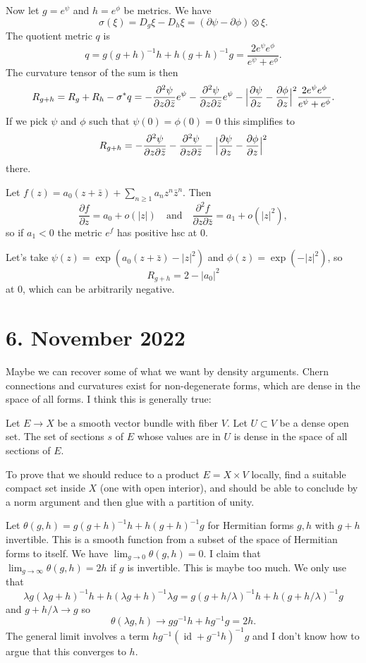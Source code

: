 \documentclass[11pt]{article}
\theoremstyle{definition}
\def\qandq{\quad\text{and}\quad}
\DeclareMathOperator{\id}{id}
\begin{document}
Now let $g = e^\psi$ and $h = e^\phi$ be metrics.
We have
$$
\sigma(\xi)
= D_{g} \xi - D_h \xi
= (\partial \psi - \partial \phi) \otimes \xi.
$$
The quotient metric $q$ is
$$
q
= g (g+h)^{-1} h + h (g+h)^{-1} g
= \frac{2 e^\psi e^\phi}{e^\psi + e^\phi}.
$$
The curvature tensor of the sum is then
$$
R_{g+h}
= R_g + R_h - \sigma^* q
= - \frac{\partial^2 \psi}{\partial z \partial \bar z} e^\psi
- \frac{\partial^2 \psi}{\partial z \partial \bar z} e^\psi
- \Bigl|
\frac{\partial \psi}{\partial z} - \frac{\partial \phi}{\partial z}
\Bigr|^2
\frac{2 e^\psi e^\phi}{e^\psi + e^\phi}.
$$
If we pick $\psi$ and $\phi$ such that $\psi(0) = \phi(0) = 0$ this
simplifies to
$$
R_{g+h}
= - \frac{\partial^2 \psi}{\partial z \partial \bar z}
- \frac{\partial^2 \psi}{\partial z \partial \bar z}
- \Bigl|
\frac{\partial \psi}{\partial z} - \frac{\partial \phi}{\partial z}
\Bigr|^2
$$
there.

Let $f(z) = a_0 (z + \bar z) + \sum_{n \geq 1} a_n z^n \bar z^n$.
Then
$$
\frac{\partial f}{\partial z} = a_0 + o(|z|)
\qandq
\frac{\partial^2 f}{\partial z \partial \bar z}
= a_1 + o(|z|^2),
$$
so if $a_1 < 0$ the metric $e^f$ has positive hsc at $0$.

Let's take $\psi(z) = \exp(a_0(z + \bar z) - |z|^2)$ and $\phi(z) = \exp(-
|z|^2)$, so
$$
R_{g+h} = 2 - |a_0|^2
$$
at $0$, which can be arbitrarily negative.



\section{6. November 2022}

Maybe we can recover some of what we want by density arguments.
Chern connections and curvatures exist for non-degenerate forms, which are
dense in the space of all forms.
I think this is generally true:

Let $E \to X$ be a smooth vector bundle with fiber $V$.
Let $U \subset V$ be a dense open set.
The set of sections $s$ of $E$ whose values are in $U$ is dense in the space of
all sections of $E$.

To prove that we should reduce to a product $E = X \times V$ locally, find a
suitable compact set inside $X$ (one with open interior), and should be able to
conclude by a norm argument and then glue with a partition of unity.


\medskip

Let $\theta(g,h) = g (g+h)^{-1} h + h (g+h)^{-1} g$ for Hermitian forms $g,h$
with $g+h$ invertible.
This is a smooth function from a subset of the space of Hermitian forms to
itself.
We have $\lim_{g \to 0} \theta(g,h) = 0$.
I claim that $\lim_{g \to \infty} \theta(g,h) = 2 h$ if $g$ is invertible.
This is maybe too much. We only use that
$$
\lambda g (\lambda g + h)^{-1} h + h (\lambda g + h)^{-1} \lambda g
= g (g + h/\lambda)^{-1} h + h (g + h / \lambda)^{-1} g
$$
and $g + h/\lambda \to g$ so
$$
\theta(\lambda g,h)
\to g g^{-1} h + h g^{-1} g = 2 h.
$$
The general limit involves a term $h g^{-1}(\id + g^{-1}h)^{-1}g$ and I don't
know how to argue that this converges to $h$.
\end{document}
